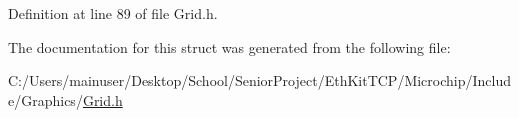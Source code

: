 Definition at line 89 of file Grid.\+h.



The documentation for this struct was generated from the following file\+:\begin{DoxyCompactItemize}
\item 
C\+:/\+Users/mainuser/\+Desktop/\+School/\+Senior\+Project/\+Eth\+Kit\+T\+C\+P/\+Microchip/\+Include/\+Graphics/\hyperlink{_grid_8h}{Grid.\+h}\end{DoxyCompactItemize}

